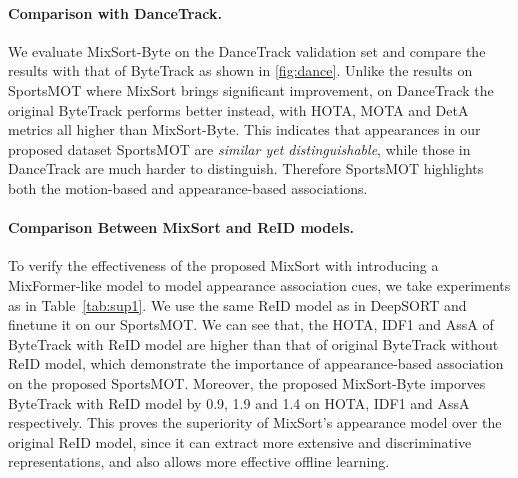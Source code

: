 \documentclass[10pt,twocolumn,letterpaper]{article}
\begin{document}
{\vspace{-3mm}
\paragraph{Comparison with DanceTrack.}
We evaluate MixSort-Byte on the DanceTrack validation set and compare the results with that of ByteTrack as shown in \cref{fig:dance}. Unlike the results on SportsMOT where MixSort brings significant improvement, on DanceTrack the original ByteTrack performs better instead, with HOTA, MOTA and DetA metrics all higher than MixSort-Byte. This indicates that appearances in our proposed dataset SportsMOT are \textit{similar yet distinguishable}, while those in DanceTrack are much harder to distinguish. Therefore SportsMOT highlights both the motion-based and appearance-based associations.
\begin{table}[pt]
\vspace{-1mm}
\vspace{-2.8mm}
\caption{Comparison of ByteTrack and MixSort-Byte on DanceTrack validation set. For MixSort-Byte, the fuse parameter  is 0.9, which results in the highest HOTA among \{0.6, 0.7, 0.8, 0.9, 0.95\}. The models are trained on DanceTrack training set.}
\vspace{-4mm}
\label{fig:dance}
\end{table}


\paragraph{Comparison Between MixSort and ReID models.}
To verify the effectiveness of the proposed MixSort with introducing a MixFormer-like model to model appearance association cues, we take experiments as in Table~\ref{tab:sup1}. 
We use the same ReID model as in DeepSORT and finetune it on our SportsMOT. 
We can see that, the HOTA, IDF1 and AssA of ByteTrack with ReID model are higher than that of original ByteTrack without ReID model, which demonstrate the importance of appearance-based association on the proposed SportsMOT.
Moreover, the proposed MixSort-Byte imporves ByteTrack with ReID model by 0.9, 1.9 and 1.4 on HOTA, IDF1 and AssA respectively.
This proves the superiority of MixSort's appearance model over the original ReID model, since it can extract more extensive and discriminative representations, and also allows more effective offline learning.

}
\end{document}
